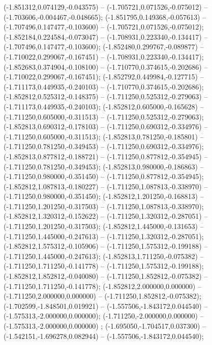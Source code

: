  (-1.851312,0.074129,-0.043575) -- (-1.705721,0.071526,-0.075012) -- (-1.703606,-0.004467,-0.048665);
 (-1.851795,0.149368,-0.057613) -- (-1.707496,0.147477,-0.103600) -- (-1.705721,0.071526,-0.075012);
 (-1.852184,0.224584,-0.073047) -- (-1.708931,0.223340,-0.134417) -- (-1.707496,0.147477,-0.103600);
 (-1.852480,0.299767,-0.089877) -- (-1.710022,0.299067,-0.167451) -- (-1.708931,0.223340,-0.134417);
 (-1.852683,0.374904,-0.108100) -- (-1.710770,0.374615,-0.202686) -- (-1.710022,0.299067,-0.167451);
 (-1.852792,0.449984,-0.127715) -- (-1.711173,0.449935,-0.240103) -- (-1.710770,0.374615,-0.202686);
 (-1.852812,0.525312,-0.148375) -- (-1.711250,0.525312,-0.279063) -- (-1.711173,0.449935,-0.240103);
 (-1.852812,0.605000,-0.165628) -- (-1.711250,0.605000,-0.311513) -- (-1.711250,0.525312,-0.279063);
 (-1.852813,0.690312,-0.178103) -- (-1.711250,0.690312,-0.334976) -- (-1.711250,0.605000,-0.311513);
 (-1.852813,0.781250,-0.185801) -- (-1.711250,0.781250,-0.349453) -- (-1.711250,0.690312,-0.334976);
 (-1.852813,0.877812,-0.188721) -- (-1.711250,0.877812,-0.354945) -- (-1.711250,0.781250,-0.349453);
 (-1.852813,0.980000,-0.186863) -- (-1.711250,0.980000,-0.351450) -- (-1.711250,0.877812,-0.354945);
 (-1.852812,1.087813,-0.180227) -- (-1.711250,1.087813,-0.338970) -- (-1.711250,0.980000,-0.351450);
 (-1.852812,1.201250,-0.168813) -- (-1.711250,1.201250,-0.317503) -- (-1.711250,1.087813,-0.338970);
 (-1.852812,1.320312,-0.152622) -- (-1.711250,1.320312,-0.287051) -- (-1.711250,1.201250,-0.317503);
 (-1.852812,1.445000,-0.131653) -- (-1.711250,1.445000,-0.247613) -- (-1.711250,1.320312,-0.287051);
 (-1.852812,1.575312,-0.105906) -- (-1.711250,1.575312,-0.199188) -- (-1.711250,1.445000,-0.247613);
 (-1.852813,1.711250,-0.075382) -- (-1.711250,1.711250,-0.141778) -- (-1.711250,1.575312,-0.199188);
 (-1.852812,1.852812,-0.040080) -- (-1.711250,1.852812,-0.075382) -- (-1.711250,1.711250,-0.141778);
 (-1.852812,2.000000,0.000000) -- (-1.711250,2.000000,0.000000) -- (-1.711250,1.852812,-0.075382);
 (-1.702599,-1.848501,0.019921) -- (-1.557506,-1.843172,0.044540) -- (-1.575313,-2.000000,0.000000);
 (-1.711250,-2.000000,0.000000) -- (-1.575313,-2.000000,0.000000) ;
 (-1.695050,-1.704517,0.037300) -- (-1.542151,-1.696278,0.082944) -- (-1.557506,-1.843172,0.044540);
